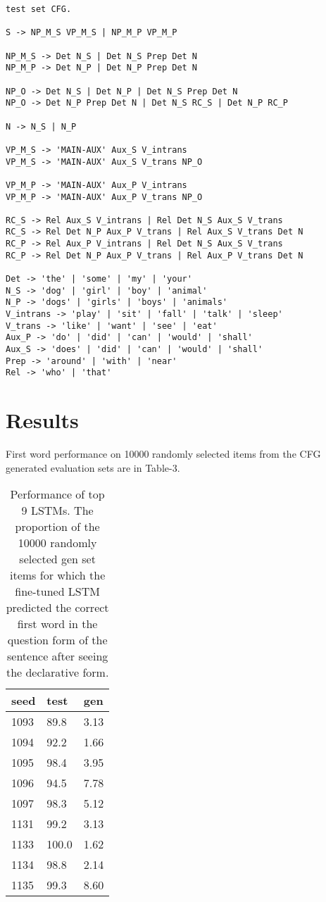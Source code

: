 \documentclass{article}
\begin{document}
\begin{verbatim}
test set CFG. 

S -> NP_M_S VP_M_S | NP_M_P VP_M_P

NP_M_S -> Det N_S | Det N_S Prep Det N
NP_M_P -> Det N_P | Det N_P Prep Det N

NP_O -> Det N_S | Det N_P | Det N_S Prep Det N 
NP_O -> Det N_P Prep Det N | Det N_S RC_S | Det N_P RC_P

N -> N_S | N_P

VP_M_S -> 'MAIN-AUX' Aux_S V_intrans
VP_M_S -> 'MAIN-AUX' Aux_S V_trans NP_O

VP_M_P -> 'MAIN-AUX' Aux_P V_intrans
VP_M_P -> 'MAIN-AUX' Aux_P V_trans NP_O

RC_S -> Rel Aux_S V_intrans | Rel Det N_S Aux_S V_trans 
RC_S -> Rel Det N_P Aux_P V_trans | Rel Aux_S V_trans Det N
RC_P -> Rel Aux_P V_intrans | Rel Det N_S Aux_S V_trans 
RC_P -> Rel Det N_P Aux_P V_trans | Rel Aux_P V_trans Det N

Det -> 'the' | 'some' | 'my' | 'your'
N_S -> 'dog' | 'girl' | 'boy' | 'animal'
N_P -> 'dogs' | 'girls' | 'boys' | 'animals'
V_intrans -> 'play' | 'sit' | 'fall' | 'talk' | 'sleep'
V_trans -> 'like' | 'want' | 'see' | 'eat'
Aux_P -> 'do' | 'did' | 'can' | 'would' | 'shall'
Aux_S -> 'does' | 'did' | 'can' | 'would' | 'shall'
Prep -> 'around' | 'with' | 'near'
Rel -> 'who' | 'that'
\end{verbatim}

\section{Results}

First word performance on 10000 randomly selected items from the CFG generated evaluation sets are in Table-3. 

\begin{table}[h!]
\centering
\begin{tabular}{@{}lll@{}}
\toprule
seed   & test   & gen \\ \midrule
1093   &  89.8  & 3.13   \\
1094   &  92.2  & 1.66   \\  
1095   &  98.4  & 3.95   \\  
1096   &  94.5  & 7.78   \\  
1097   &  98.3  & 5.12   \\  
1131   &  99.2  & 3.13   \\  
1133   & 100.0  & 1.62   \\  
1134   &  98.8  & 2.14   \\  
1135   &  99.3  & 8.60   \\ \bottomrule
\end{tabular}
\caption{Performance of top 9 LSTMs. The proportion of the 10000 randomly selected gen set items for which the fine-tuned LSTM predicted the correct first word in the question form of the sentence after seeing the declarative form.}
\end{table}
\end{document}
